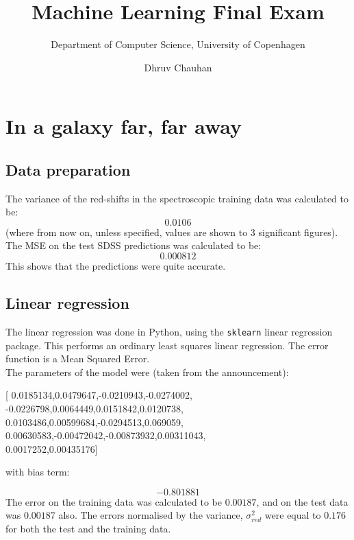 \documentclass{scrartcl}
\begin{document}
\title{Machine Learning Final Exam}
\subtitle{Department of Computer Science, University of Copenhagen}
\author{Dhruv Chauhan}
\maketitle

\section{In a galaxy far, far away}
\subsection{Data preparation}
The variance of the red-shifts in the spectroscopic training data was calculated to be:
\[ 0.0106 \]
(where from now on, unless specified, values are shown to 3 significant figures). \\

The MSE on the test SDSS predictions was calculated to be:
\[ 0.000812 \]
This shows that the predictions were quite accurate.

\subsection{Linear regression}

The linear regression was done in Python, using the \texttt{sklearn} linear regression package. This performs an ordinary least squares linear regression. The error function is a Mean Squared Error. \\

The parameters of the model were (taken from the announcement):
\begin{center}
[  0.0185134,0.0479647,-0.0210943,-0.0274002, \\
-0.0226798,0.0064449,0.0151842,0.0120738, \\
0.0103486,0.00599684,-0.0294513,0.069059, \\
0.00630583,-0.00472042,-0.00873932,0.00311043, \\
0.0017252,0.00435176]
\end{center}

with bias term:

\[ -0.801881 \]
The error on the training data was calculated to be $0.00187$, and on the test data was $0.00187$ also. The errors normalised by the variance, $\sigma^2_{red}$ were equal to $0.176$ for both the test and the training data. \\
\end{document}
